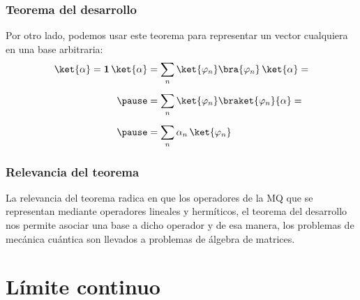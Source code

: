 \begin{frame}
\frametitle{Teorema del desarrollo}
 Por otro lado, podemos usar este teorema para representar un vector cualquiera en una base arbitraria:
\begin{eqnarray}
\begin{aligned}[b]
\ket{\alpha} = \mathbf{1} \, \ket{\alpha} &= \sum_{n} \ket{\varphi_{n}} \bra{\varphi_{n}} \, \ket{\alpha} = \\[0.5em] \pause
&= \sum_{n} \ket{\varphi_{n}} \braket{\varphi_{n}}{\alpha} = \\[0.5em] \pause
&= \sum_{n} \alpha_{n} \, \ket{\varphi_{n}}
\end{aligned}
\label{eq:ecuacion_13}
\end{eqnarray}
\end{frame}
\begin{frame}
\frametitle{Relevancia del teorema}
La relevancia del teorema radica en que los operadores de la MQ que se representan mediante operadores lineales y hermíticos, el teorema del desarrollo nos permite asociar una base a dicho operador y de esa manera, los problemas de mecánica cuántica son llevados a problemas de álgebra de matrices.
\end{frame}
\section{Límite continuo}
